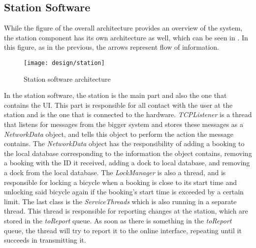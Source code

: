 \subsection{Station Software}
While the figure of the overall architecture provides an overview of the system, the station component has its own architecture as well, which can be seen in . In this figure, as in the previous, the arrows represent flow of information.

\begin{figure}[h]
	\centering
	\texttt{[image: design/station]}
	\caption{Station software architecture}\label{fig:stationarch}
\end{figure}

In the station software, the station is the main part and also the one that contains the UI. 
This part is responsible for all contact with the user at the station and is the one that is connected to the hardware.
\textit{TCPListener} is a thread that listens for messages from the bigger system and stores these messages as a \textit{NetworkData} object, and tells this object to perform the action the message contains.
The \textit{NetworkData} object has the responsibility of adding a booking to the local database corresponding to the information the object contains, removing a booking with the ID it received, adding a dock to local database, and removing a dock from the local database.
The \textit{LockManager} is also a thread, and is responsible for locking a bicycle when a booking is close to its start time and unlocking said bicycle again if the booking's start time is exceeded by a certain limit.
The last class is the \textit{ServiceThreads} which is also running in a separate thread.
This thread is responsible for reporting changes at the station, which are stored in the \textit{toReport} queue.
As soon as there is something in the \textit{toReport} queue, the thread will try to report it to the online interface, repeating until it succeeds in transmitting it.